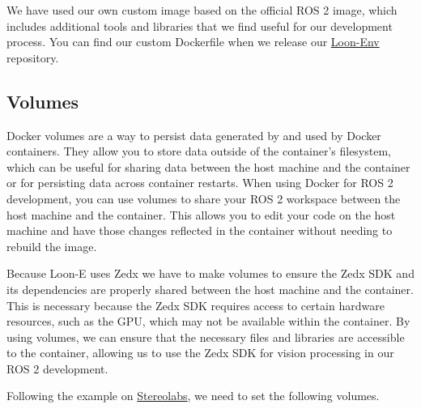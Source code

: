 We have used our own custom image based on the official ROS 2 image, which includes additional tools and libraries that we find useful for our development process. You can find our custom Dockerfile when we release our \href{https://github.com/HumberASV/Loon-Env}{Loon-Env} repository.


\subsection{Volumes}

Docker volumes are a way to persist data generated by and used by Docker containers. They allow you to store data outside of the container's filesystem, which can be useful for sharing data between the host machine and the container or for persisting data across container restarts. When using Docker for ROS 2 development, you can use volumes to share your ROS 2 workspace between the host machine and the container. This allows you to edit your code on the host machine and have those changes reflected in the container without needing to rebuild the image.

Because Loon-E uses Zedx we have to make volumes to ensure the Zedx SDK and its dependencies are properly shared between the host machine and the container. This is necessary because the Zedx SDK requires access to certain hardware resources, such as the GPU, which may not be available within the container. By using volumes, we can ensure that the necessary files and libraries are accessible to the container, allowing us to use the Zedx SDK for vision processing in our ROS 2 development.

Following the example on \href{https://www.stereolabs.com/docs/cameras/zed-x/zed-x-and-docker}{Stereolabs}, we need to set the following volumes.

